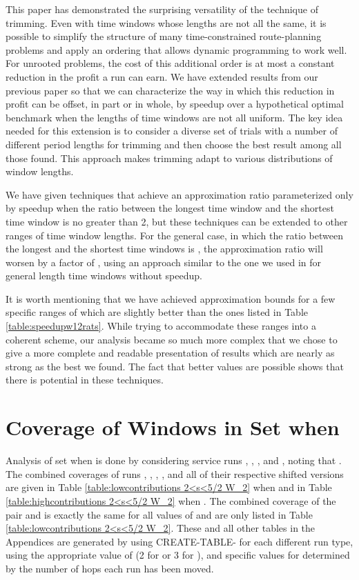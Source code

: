 \documentclass[11pt]{article}
\begin{document}
This paper has demonstrated the surprising versatility of the technique of trimming. Even with time windows whose lengths are not all the same, it is possible to simplify the structure of many time-constrained route-planning problems and apply an ordering that allows dynamic programming to work well.  For unrooted problems, the cost of this additional order is at most a constant reduction in the profit a run can earn.  We have extended results from our previous paper \cite{Frederickson5} so that we can characterize the way in which this reduction in profit can be offset, in part or in whole, by speedup over a hypothetical optimal benchmark when the lengths of time windows are not all uniform.  The key idea needed for this extension is to consider a diverse set of trials with a number of different period lengths for trimming and then choose the best result among all those found.  This approach makes trimming adapt to various distributions of window lengths.

We have given techniques that achieve an approximation ratio parameterized only by speedup when the ratio between the longest time window and the shortest time window is no greater than 2, but these techniques can be extended to other ranges of time window lengths.  For the general case, in which the ratio between the longest and the shortest time windows is , the approximation ratio will worsen by a factor of , using an approach similar to the one we used in \cite{Frederickson6} for general length time windows without speedup.

It is worth mentioning that we have achieved approximation bounds for a few specific ranges of  which are slightly better than the ones listed in Table \ref{table:speedupw12rats}.  While trying to accommodate these ranges into a coherent scheme, our analysis became so much more complex that we chose to give a more complete and readable presentation of results which are nearly as strong as the best we found.  The fact that better values are possible shows that there is potential in these techniques.




\appendix

\section{Coverage of Windows in Set  when }
\label{appendix:2<s<3 W_2}

Analysis of set  when  is done by considering service runs , , , and , noting that .  The combined coverages of runs , , , , and all of their respective shifted versions are given in Table \ref{table:lowcontributions 2<s<5/2 W_2} when  and in Table \ref{table:highcontributions 2<s<5/2 W_2} when .  
The combined coverage of the pair  and  is exactly the same for all values of  and are only listed in Table \ref{table:lowcontributions 2<s<5/2 W_2}.  These and all other tables in the Appendices are generated by using CREATE-TABLE- for each different run type, using the appropriate value of  (2 for  or 3 for ), and specific values for  determined by the number of hops each run has been moved.
\end{document}
